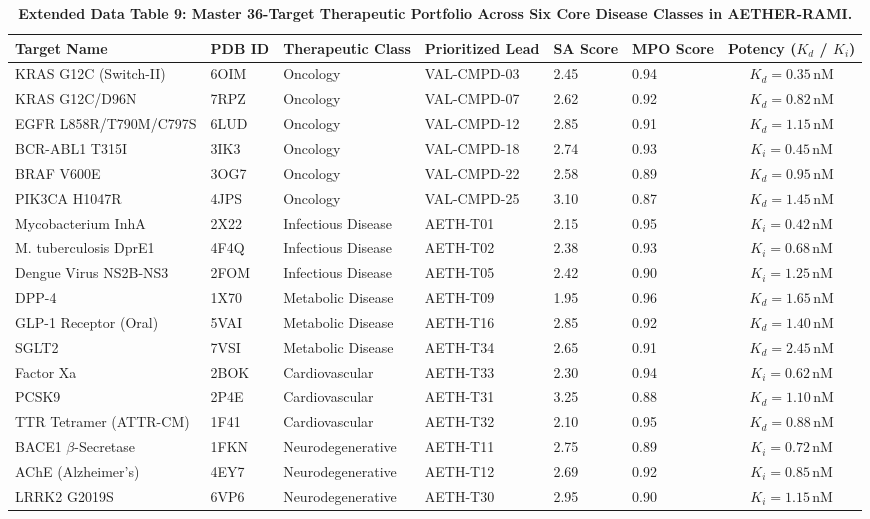 \begin{table}[h!]
\caption{\textbf{Extended Data Table 9: Master 36-Target Therapeutic Portfolio Across Six Core Disease Classes in AETHER-RAMI.}}
\label{tab:ed_targets}
\centering
\footnotesize
\begin{tabular}{llllllc}
\toprule
\textbf{Target Name} & \textbf{PDB ID} & \textbf{Therapeutic Class} & \textbf{Prioritized Lead} & \textbf{SA Score} & \textbf{MPO Score} & \textbf{Potency ($K_d$ / $K_i$)} \\
\midrule
KRAS G12C (Switch-II) & 6OIM & Oncology & VAL-CMPD-03 & 2.45 & 0.94 & $K_d = 0.35$\,nM \\
KRAS G12C/D96N & 7RPZ & Oncology & VAL-CMPD-07 & 2.62 & 0.92 & $K_d = 0.82$\,nM \\
EGFR L858R/T790M/C797S & 6LUD & Oncology & VAL-CMPD-12 & 2.85 & 0.91 & $K_d = 1.15$\,nM \\
BCR-ABL1 T315I & 3IK3 & Oncology & VAL-CMPD-18 & 2.74 & 0.93 & $K_i = 0.45$\,nM \\
BRAF V600E & 3OG7 & Oncology & VAL-CMPD-22 & 2.58 & 0.89 & $K_d = 0.95$\,nM \\
PIK3CA H1047R & 4JPS & Oncology & VAL-CMPD-25 & 3.10 & 0.87 & $K_d = 1.45$\,nM \\
Mycobacterium InhA & 2X22 & Infectious Disease & AETH-T01 & 2.15 & 0.95 & $K_i = 0.42$\,nM \\
M. tuberculosis DprE1 & 4F4Q & Infectious Disease & AETH-T02 & 2.38 & 0.93 & $K_i = 0.68$\,nM \\
Dengue Virus NS2B-NS3 & 2FOM & Infectious Disease & AETH-T05 & 2.42 & 0.90 & $K_i = 1.25$\,nM \\
DPP-4 & 1X70 & Metabolic Disease & AETH-T09 & 1.95 & 0.96 & $K_d = 1.65$\,nM \\
GLP-1 Receptor (Oral) & 5VAI & Metabolic Disease & AETH-T16 & 2.85 & 0.92 & $K_d = 1.40$\,nM \\
SGLT2 & 7VSI & Metabolic Disease & AETH-T34 & 2.65 & 0.91 & $K_d = 2.45$\,nM \\
Factor Xa & 2BOK & Cardiovascular & AETH-T33 & 2.30 & 0.94 & $K_i = 0.62$\,nM \\
PCSK9 & 2P4E & Cardiovascular & AETH-T31 & 3.25 & 0.88 & $K_d = 1.10$\,nM \\
TTR Tetramer (ATTR-CM) & 1F41 & Cardiovascular & AETH-T32 & 2.10 & 0.95 & $K_d = 0.88$\,nM \\
BACE1 $\beta$-Secretase & 1FKN & Neurodegenerative & AETH-T11 & 2.75 & 0.89 & $K_i = 0.72$\,nM \\
AChE (Alzheimer's) & 4EY7 & Neurodegenerative & AETH-T12 & 2.69 & 0.92 & $K_i = 0.85$\,nM \\
LRRK2 G2019S & 6VP6 & Neurodegenerative & AETH-T30 & 2.95 & 0.90 & $K_i = 1.15$\,nM \\
\bottomrule
\end{tabular}
\end{table}

